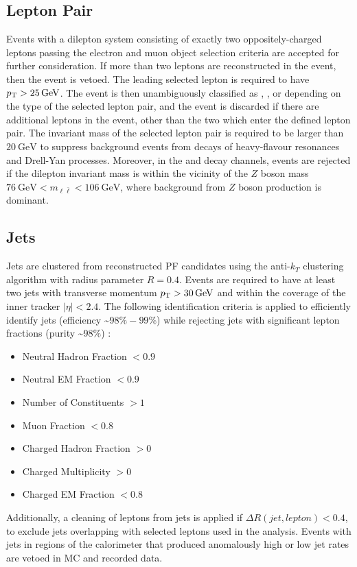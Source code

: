 \subsection{Lepton Pair}
Events with a dilepton system consisting of exactly two oppositely-charged leptons passing the electron and muon object selection criteria are accepted for further consideration.
If more than two leptons are reconstructed in the event, then the event is vetoed.
The leading selected lepton is required to have $\pT > \SI{25}{\GeV}$.
The event is then unambiguously classified as \ee, \emu, or \mumu depending on the type of the selected lepton pair, and the event is discarded if there are additional leptons in the event, other than the two which enter the defined lepton pair.
The invariant mass of the selected lepton pair is required to be larger than $\SI{20}{\GeV}$ to suppress background events from decays of heavy-flavour resonances and Drell-Yan processes.
Moreover, in the \mumu and \ee decay channels, events are rejected if the dilepton invariant mass is within the vicinity of the $Z$ boson mass $\SI{76}{\GeV} < m_{\ell\bar{\ell}} < \SI{106}{\GeV}$, where background from $Z$ boson production is dominant.

\subsection{Jets}
Jets are clustered from reconstructed PF candidates using the anti-$k_T$ clustering algorithm with radius parameter $R = 0.4$.
Events are required to have at least two jets with transverse momentum $\pT > \SI{30}{\GeV}$ and within the coverage of the inner tracker $\vert \eta \vert < 2.4$. 
The following identification criteria is applied to efficiently identify jets (efficiency \sim $98\% - 99\%$) while rejecting jets with significant lepton fractions (purity \sim $98\%$) :
\begin{itemize}
\item Neutral Hadron Fraction $<0.9$
\item Neutral EM Fraction $<0.9$
\item Number of Constituents $>1$
\item Muon Fraction $<0.8$
\item Charged Hadron Fraction $>0$
\item Charged Multiplicity $> 0$
\item Charged EM Fraction $<0.8$ 
\end{itemize}
Additionally, a cleaning of leptons from jets is applied if $\Delta R(jet,lepton)<0.4$, to exclude jets overlapping with selected leptons used in the analysis.
Events with jets in regions of the calorimeter that produced anomalously high or low jet rates are vetoed in MC and recorded data.


